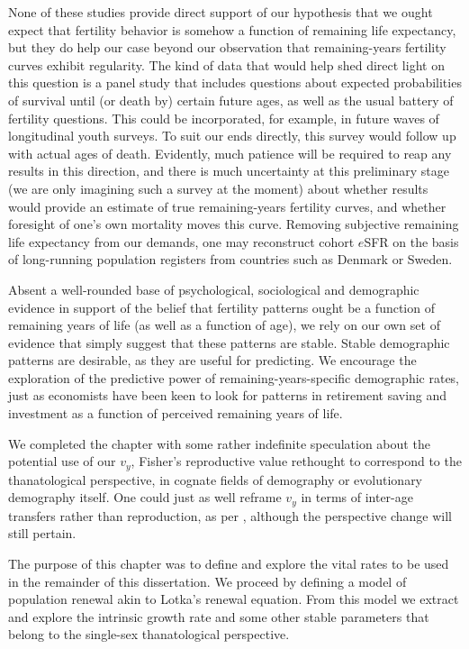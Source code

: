 None of these studies provide
direct support of our hypothesis that we ought expect that fertility behavior is
somehow a function of remaining life expectancy, but they do help our case
beyond our observation that remaining-years fertility curves exhibit regularity. 
The kind of data that would help shed direct light on this question is a
panel study that includes questions about expected probabilities of survival 
until (or death by) certain future ages, as well as the usual battery of fertility 
questions. This could be incorporated, for example, in future waves of
longitudinal youth surveys. To suit our ends directly, this survey would follow
up with actual ages of death. Evidently, much patience will be required to reap
any results in this direction, and there is much uncertainty at this preliminary
stage (we are only imagining such a survey at the moment) about whether results
would provide an estimate of true remaining-years fertility curves, and whether
foresight of one's own mortality moves this curve. Removing subjective
remaining life expectancy from our demands, one may reconstruct cohort $e$SFR on 
the basis of long-running population registers from countries such as Denmark or
Sweden.

Absent a well-rounded base of psychological, sociological and demographic
evidence in support of the belief that fertility patterns ought be a function of
remaining years of life (as well as a function of age), we rely on our own
set of evidence that simply suggest that these patterns are stable. Stable
demographic patterns are desirable, as they are useful for predicting. We encourage
the exploration of the predictive power of remaining-years-specific
demographic rates, just as economists have been keen to look for patterns in
retirement saving and investment as a function of perceived remaining years of
life.

We completed the chapter with some rather indefinite speculation about the
potential use of our $v_y$, Fisher's reproductive value rethought to correspond
to the thanatological perspective, in cognate fields of demography or
evolutionary demography itself. One could just as well reframe $v_y$ in terms of
inter-age transfers rather than reproduction, as per \citet{lee2003rethinking},
although the perspective change will still pertain.

The purpose of this chapter was to define and explore the vital rates to be used
in the remainder of this dissertation. We proceed by defining a model of
population renewal akin to Lotka's renewal equation. From this model we
extract and explore the intrinsic growth rate and some other stable
parameters that belong to the single-sex thanatological perspective. 

\FloatBarrier



